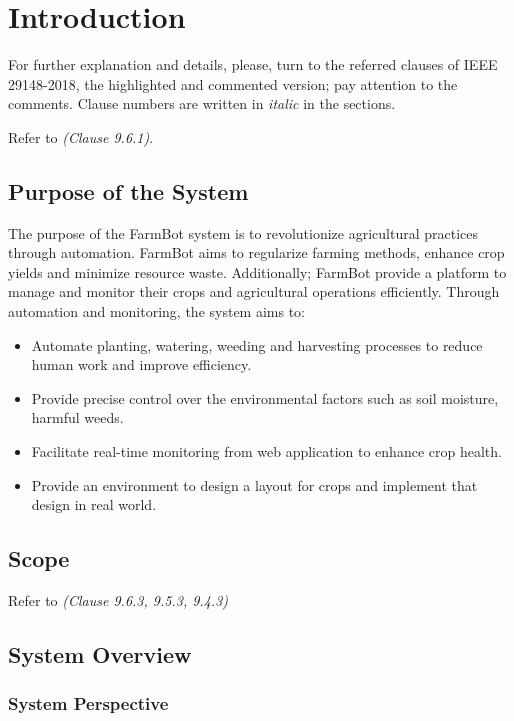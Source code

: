 
\chapter{Introduction} \label{introduction}

For further explanation and details, please, turn to the referred clauses of IEEE 29148-2018, the highlighted and commented version; pay attention to the comments. Clause numbers are written in \textit{italic} in the sections.

Refer to \textit{(Clause 9.6.1)}. 

\section{Purpose of the System }

The purpose of the FarmBot system is to revolutionize agricultural practices through automation. FarmBot aims to regularize farming methods, enhance crop yields and minimize resource waste. Additionally; FarmBot provide a platform to manage and monitor their crops and agricultural operations efficiently. Through automation and monitoring, the system aims to:

\begin{itemize}
    \item Automate planting, watering, weeding and harvesting processes to reduce human work and improve efficiency.
    \item Provide precise control over the environmental factors such as soil moisture, harmful weeds.
    \item Facilitate real-time monitoring from web application to enhance crop health.
    \item Provide an environment to design a layout for crops and implement that design in real world.
\end{itemize}

\section{Scope}

Refer to \textit{(Clause 9.6.3, 9.5.3, 9.4.3)}

\section{System Overview}


\subsection{System Perspective}

